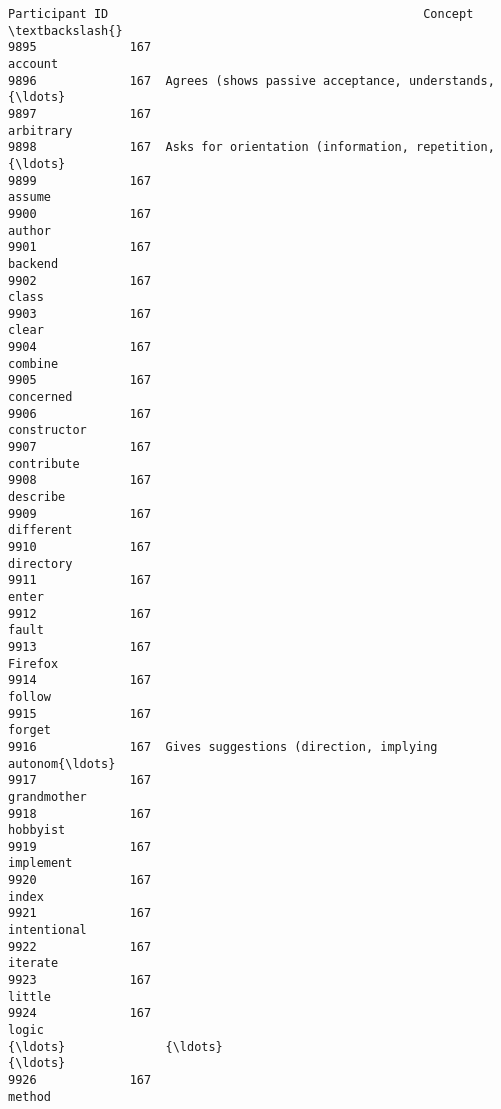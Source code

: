 \documentclass[11pt]{article}
\begin{document}
    \begin{Verbatim}[commandchars=\\\{\}]
      Participant ID                                            Concept  \textbackslash{}
9895             167                                            account   
9896             167  Agrees (shows passive acceptance, understands,{\ldots}   
9897             167                                          arbitrary   
9898             167  Asks for orientation (information, repetition,{\ldots}   
9899             167                                             assume   
9900             167                                             author   
9901             167                                            backend   
9902             167                                              class   
9903             167                                              clear   
9904             167                                            combine   
9905             167                                          concerned   
9906             167                                        constructor   
9907             167                                         contribute   
9908             167                                           describe   
9909             167                                          different   
9910             167                                          directory   
9911             167                                              enter   
9912             167                                              fault   
9913             167                                            Firefox   
9914             167                                             follow   
9915             167                                             forget   
9916             167  Gives suggestions (direction, implying autonom{\ldots}   
9917             167                                        grandmother   
9918             167                                           hobbyist   
9919             167                                          implement   
9920             167                                              index   
9921             167                                        intentional   
9922             167                                            iterate   
9923             167                                             little   
9924             167                                              logic   
{\ldots}              {\ldots}                                                {\ldots}   
9926             167                                             method   

\end{Verbatim}
\end{document}
